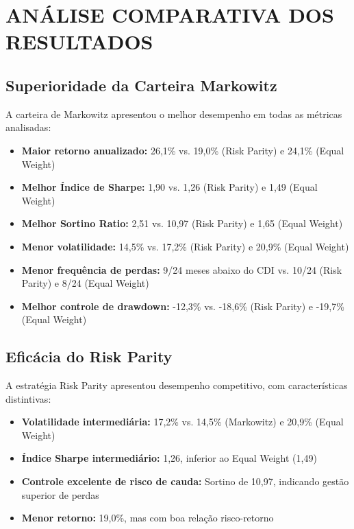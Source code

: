 \section{ANÁLISE COMPARATIVA DOS RESULTADOS}

\subsection{Superioridade da Carteira Markowitz}

A carteira de Markowitz apresentou o melhor desempenho em todas as métricas analisadas:

\begin{itemize}
    \item \textbf{Maior retorno anualizado:} 26,1\% vs. 19,0\% (Risk Parity) e 24,1\% (Equal Weight)
    \item \textbf{Melhor Índice de Sharpe:} 1,90 vs. 1,26 (Risk Parity) e 1,49 (Equal Weight)
    \item \textbf{Melhor Sortino Ratio:} 2,51 vs. 10,97 (Risk Parity) e 1,65 (Equal Weight)
    \item \textbf{Menor volatilidade:} 14,5\% vs. 17,2\% (Risk Parity) e 20,9\% (Equal Weight)
    \item \textbf{Menor frequência de perdas:} 9/24 meses abaixo do CDI vs. 10/24 (Risk Parity) e 8/24 (Equal Weight)
    \item \textbf{Melhor controle de drawdown:} -12,3\% vs. -18,6\% (Risk Parity) e -19,7\% (Equal Weight)
\end{itemize}

\subsection{Eficácia do Risk Parity}

A estratégia Risk Parity apresentou desempenho competitivo, com características distintivas:

\begin{itemize}
    \item \textbf{Volatilidade intermediária:} 17,2\% vs. 14,5\% (Markowitz) e 20,9\% (Equal Weight)
    \item \textbf{Índice Sharpe intermediário:} 1,26, inferior ao Equal Weight (1,49)
    \item \textbf{Controle excelente de risco de cauda:} Sortino de 10,97, indicando gestão superior de perdas
    \item \textbf{Menor retorno:} 19,0\%, mas com boa relação risco-retorno
\end{itemize}

